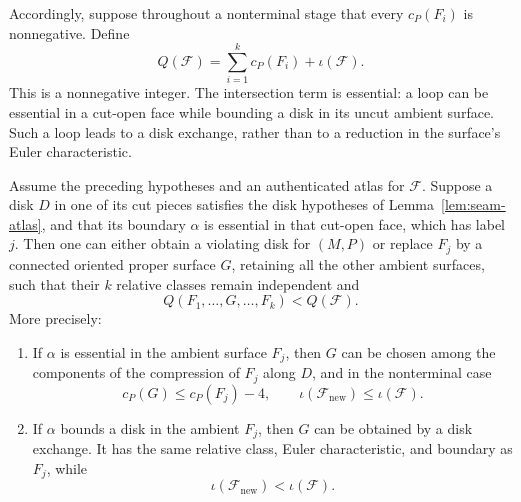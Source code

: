 Accordingly, suppose throughout a nonterminal stage that every
$c_P(F_i)$ is nonnegative.  Define
\begin{equation}
                  Q(\mathcal F)
                  =\sum_{i=1}^k c_P(F_i)+\iota(\mathcal F).
                  \label{eq:seam-potential}
\end{equation}
This is a nonnegative integer.  The intersection term is essential: a
loop can be essential in a cut-open face while bounding a disk in its
uncut ambient surface.  Such a loop leads to a disk exchange, rather
than to a reduction in the surface's Euler characteristic.

\begin{theorem}
\label{thm:seam-repair}
Assume the preceding hypotheses and an authenticated atlas for
$\mathcal F$.  Suppose a disk $D$ in one of its cut pieces satisfies the
disk hypotheses of Lemma~\ref{lem:seam-atlas}, and that its boundary
$\alpha$ is essential in that cut-open face, which has label $j$.
Then one can either obtain a violating disk for $(M,P)$ or replace
$F_j$ by a connected oriented proper surface $G$, retaining all the
other ambient surfaces, such that their $k$ relative classes remain
independent and
\[
                   Q(F_1,\ldots,G,\ldots,F_k)
                      <Q(\mathcal F).
\]
More precisely:
\begin{enumerate}
\item If $\alpha$ is essential in the ambient surface $F_j$, then
      $G$ can be chosen among the components of the compression of
      $F_j$ along $D$, and in the nonterminal case
      \[
          c_P(G)\le c_P(F_j)-4,
          \qquad \iota(\mathcal F_{\mathrm{new}})
                         \le\iota(\mathcal F).
      \]
\item If $\alpha$ bounds a disk in the ambient $F_j$, then $G$ can
      be obtained by a disk exchange.  It has the same relative class,
      Euler characteristic, and boundary as $F_j$, while
      \[
                     \iota(\mathcal F_{\mathrm{new}})
                         <\iota(\mathcal F).
      \]
\end{enumerate}
\end{theorem}

